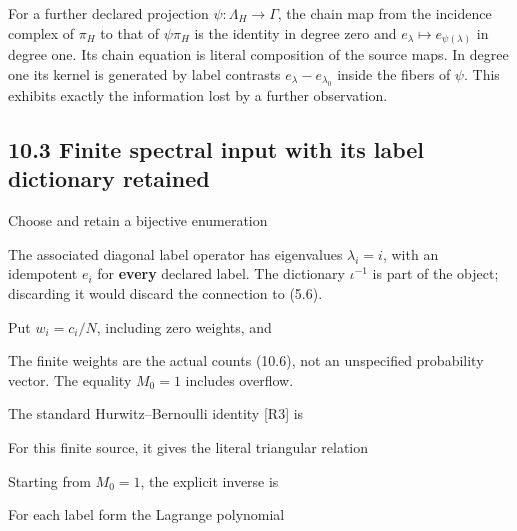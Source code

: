For a further declared projection \(\psi:\Lambda_H\to\Gamma\), the chain
map from the incidence complex of \(\pi_H\) to that of \(\psi\pi_H\) is
the identity in degree zero and \(e_\lambda\mapsto e_{\psi(\lambda)}\)
in degree one. Its chain equation is literal composition of the source
maps. In degree one its kernel is generated by label contrasts
\(e_\lambda-e_{\lambda_0}\) inside the fibers of \(\psi\). This exhibits
exactly the information lost by a further observation.

\subsection{10.3 Finite spectral input with its label dictionary
retained}

Choose and retain a bijective enumeration


The associated diagonal label operator has eigenvalues \(\lambda_i=i\),
with an idempotent \(e_i\) for \textbf{every} declared label. The
dictionary \(\iota^{-1}\) is part of the object; discarding it would
discard the connection to (5.6).

Put \(w_i=c_i/N\), including zero weights, and


The finite weights are the actual counts (10.6), not an unspecified
probability vector. The equality \(M_0=1\) includes overflow.

The standard Hurwitz--Bernoulli identity {[}R3{]} is


For this finite source, it gives the literal triangular relation


Starting from \(M_0=1\), the explicit inverse is


For each label form the Lagrange polynomial


